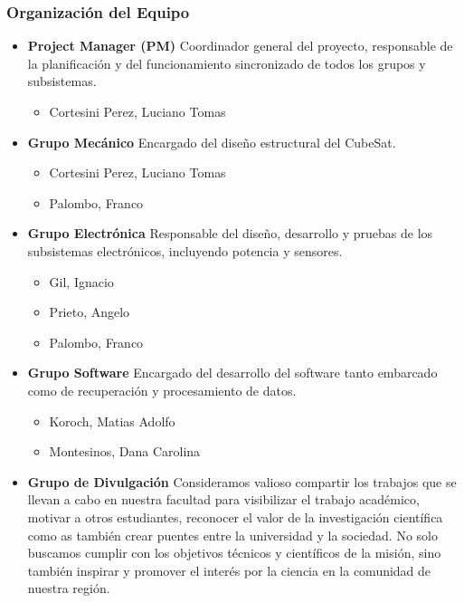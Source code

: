     \subsubsection{Organización del Equipo}
      \begin{itemize}
        \item \textbf{Project Manager (PM)}
          Coordinador general del proyecto, responsable de la planificación y del funcionamiento
          sincronizado de todos los grupos y subsistemas.
          \begin{itemize}
            \item Cortesini Perez, Luciano Tomas
          \end{itemize}
        \item \textbf{Grupo Mecánico}
         Encargado del diseño estructural del CubeSat.
          \begin{itemize}
            \item Cortesini Perez, Luciano Tomas
            \item Palombo, Franco
          \end{itemize}
        \item \textbf{Grupo Electrónica}
          Responsable del diseño, desarrollo y pruebas de los subsistemas electrónicos, incluyendo
          potencia y sensores.
          \begin{itemize}
            \item Gil, Ignacio
            \item Prieto, Angelo
            \item Palombo, Franco
          \end{itemize}
          \item \textbf{Grupo Software}
          Encargado del desarrollo del software tanto embarcado como de recuperación y procesamiento de datos.
          \begin{itemize}
            \item Koroch, Matias Adolfo
            \item Montesinos, Dana Carolina
          \end{itemize}
        \item \textbf{Grupo de Divulgación}
          Consideramos valioso compartir los trabajos que se llevan a cabo en nuestra facultad para
          visibilizar el trabajo académico, motivar a otros estudiantes, reconocer el valor de la investigación
          científica como as también crear puentes entre la universidad y la sociedad. No solo buscamos cumplir con los
          objetivos técnicos y científicos de la misión, sino también inspirar y promover el interés por la ciencia en
          la comunidad de nuestra región.


\end{itemize}
